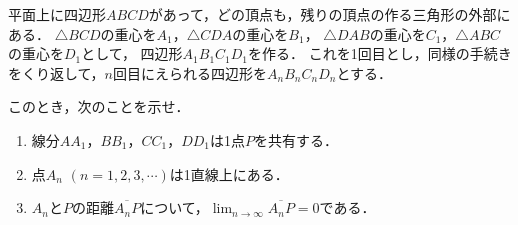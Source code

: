 \documentclass[../../main.tex]{subfiles}
\begin{document}
平面上に四辺形$ABCD$があって，どの頂点も，残りの頂点の作る三角形の外部にある．
$\triangle BCD$の重心を$A_1$，$\triangle CDA$の重心を$B_1$，
$\triangle DAB$の重心を$C_1$，$\triangle ABC$の重心を$D_1$として，
四辺形$A_1B_1C_1D_1$を作る．
これを1回目とし，同様の手続きをくり返して，$n$回目にえられる四辺形を$A_nB_nC_nD_n$とする．

このとき，次のことを示せ．
\begin{enumerate}
  \item 線分$AA_1$，$BB_1$，$CC_1$，$DD_1$は1点$P$を共有する．
  \item 点$A_n$ $(n=1,2,3,\cdots)$は1直線上にある．
  \item $A_n$と$P$の距離$\overline{A_nP}$について，$\displaystyle\lim_{n\to\infty}\overline{A_nP}=0$である．
\end{enumerate}
\end{document}
